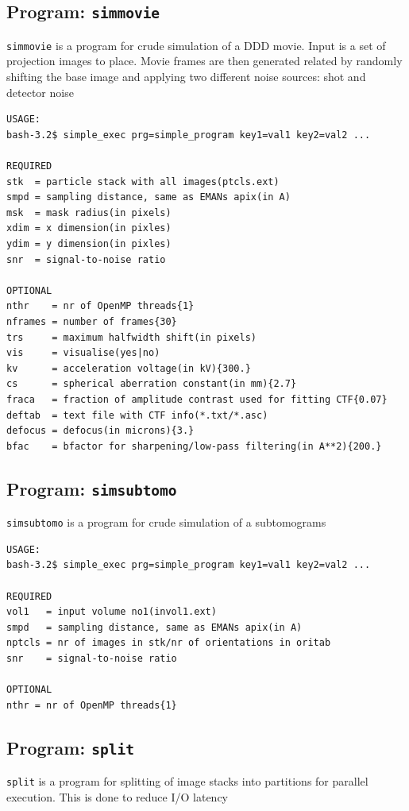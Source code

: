 \documentclass[a4paper,11pt]{article}
\newcommand{\prgname}[1]{\textcolor{NavyBlue}{\texttt{#1}}}
\begin{document}
\subsection{Program: \prgname{simmovie}}
\label{simmovie}
\prgname{simmovie} is a program for crude simulation of a DDD movie. Input is a set of projection images to place. Movie frames are then generated related by randomly shifting the base image and applying two different noise sources: shot and detector noise

\begin{verbatim}
USAGE:
bash-3.2$ simple_exec prg=simple_program key1=val1 key2=val2 ...

REQUIRED
stk  = particle stack with all images(ptcls.ext)
smpd = sampling distance, same as EMANs apix(in A)
msk  = mask radius(in pixels)
xdim = x dimension(in pixles)
ydim = y dimension(in pixles)
snr  = signal-to-noise ratio

OPTIONAL
nthr    = nr of OpenMP threads{1}
nframes = number of frames{30}
trs     = maximum halfwidth shift(in pixels)
vis     = visualise(yes|no)
kv      = acceleration voltage(in kV){300.}
cs      = spherical aberration constant(in mm){2.7}
fraca   = fraction of amplitude contrast used for fitting CTF{0.07}
deftab  = text file with CTF info(*.txt/*.asc)
defocus = defocus(in microns){3.}
bfac    = bfactor for sharpening/low-pass filtering(in A**2){200.}
\end{verbatim}

\subsection{Program: \prgname{simsubtomo}}
\label{simsubtomo}
\prgname{simsubtomo} is a program for crude simulation of a subtomograms

\begin{verbatim}
USAGE:
bash-3.2$ simple_exec prg=simple_program key1=val1 key2=val2 ...

REQUIRED
vol1   = input volume no1(invol1.ext)
smpd   = sampling distance, same as EMANs apix(in A)
nptcls = nr of images in stk/nr of orientations in oritab
snr    = signal-to-noise ratio

OPTIONAL
nthr = nr of OpenMP threads{1}
\end{verbatim}

\subsection{Program: \prgname{split}}
\label{split}
\prgname{split} is a program for splitting of image stacks into partitions for parallel execution. This is done to reduce I/O latency
\end{document}
